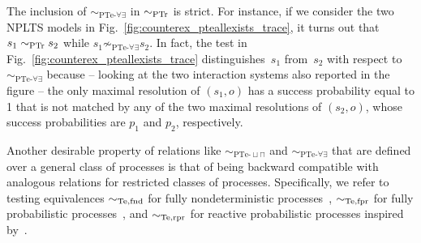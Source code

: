 \documentclass{LMCS}
\newcommand{\sbis}[1]
	{\sim_{#1}}
\begin{document}
The inclusion of $\sbis{\textrm{PTe-}\forall\exists}$ in $\sbis{\rm PTr}$ is strict. For instance, if we
consider the two NPLTS models in Fig.~\ref{fig:counterex_pteallexists_trace}, it turns out that $s_{1}
\sbis{\rm PTr} s_{2}$ while $s_{1} \not\sbis{\textrm{PTe-}\forall\exists} s_{2}$. In fact, the test in
Fig.~\ref{fig:counterex_pteallexists_trace} distinguishes~$s_{1}$ from~$s_{2}$ with respect to
$\sbis{\textrm{PTe-}\forall\exists}$ because -- looking at the two interaction systems also reported in the
figure -- the only maximal resolution of $(s_{1}, o)$ has a success probability equal to 1 that is not
matched by any of the two maximal resolutions of $(s_{2}, o)$, whose success probabilities are $p_{1}$ and
$p_{2}$, respectively.

Another desirable property of relations like $\sbis{\textrm{PTe-}\sqcup\sqcap}$ and
$\sbis{\textrm{PTe-}\forall\exists}$ that are defined over a general class of processes is that of being
backward compatible with analogous relations for restricted classes of processes. Specifically, we refer to
testing equivalences $\sbis{\rm Te,fnd}$ for fully nondeterministic processes~\cite{DH84}, $\sbis{\rm
Te,fpr}$ for fully probabilistic processes~\cite{CDSY99}, and $\sbis{\rm Te,rpr}$ for reactive probabilistic
processes inspired by~\cite{KN98}.
\end{document}
